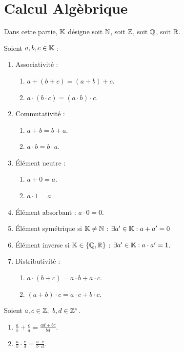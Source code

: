 \chapter{Calcul Algèbrique}
\def\arraystretch{1}

\par \noindent Dans cette partie, $\mathbb{K}$ désigne soit $\mathbb{N}$, soit $\mathbb{Z}$, soit $\mathbb{Q}$, soit $\mathbb{R}$.

\begin{proposition}
    Soient $a, b, c \in \mathbb{K}$ :
    \begin{enumerate}
    	\item Associativité :
    	\begin{enumerate}
    		\item $a + (b + c) = (a + b) + c$.
    		\item $a \cdot (b \cdot c) = (a \cdot b) \cdot c$.
    	\end{enumerate}
    	\item Commutativité : 
    	\begin{enumerate}
    		\item $a + b = b + a$.
    		\item $a \cdot b = b \cdot a$.
    	\end{enumerate}
    	\item \'Elément neutre :
    	\begin{enumerate}
    		\item $a + 0 = a$.
    		\item $a \cdot 1 = a$.
    	\end{enumerate}
    	\item \'Elément absorbant : $a \cdot 0 = 0$.
    	\item \'Elément symétrique si $\mathbb{K} \neq \mathbb{N}$ : $\exists a' \in \mathbb{K} : a + a' = 0$
    	\item \'Elément inverse si $\mathbb{K} \in \{\mathbb{Q}, \mathbb{R}\}$ : $\exists a' \in \mathbb{K} : a \cdot a' = 1$.
    	\item Distributivité :
    	\begin{enumerate}
    		\item $a \cdot (b + c) = a \cdot b + a \cdot c$.
    		\item $(a + b) \cdot c = a \cdot c + b \cdot c$.
    	\end{enumerate}
    \end{enumerate}
\end{proposition}

\begin{proposition}
    Soient $a, c \in \mathbb{Z},\ b, d \in \mathbb{Z}^*$.
    \begin{enumerate}
    	\item $\frac{a}{b} + \frac{c}{d} = \frac{ad + bc}{bd}$.
    	\item $\frac{a}{b} \cdot \frac{c}{d} = \frac{a \cdot c}{b \cdot d}$.
    \end{enumerate}
\end{proposition}

